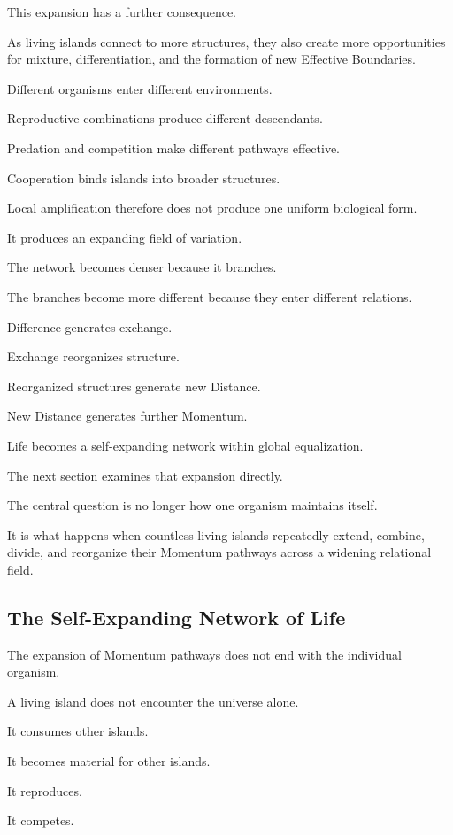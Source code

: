 This expansion has a further consequence.

As living islands connect to more structures, they also create more opportunities for mixture, differentiation, and the formation of new Effective Boundaries.

Different organisms enter different environments.

Reproductive combinations produce different descendants.

Predation and competition make different pathways effective.

Cooperation binds islands into broader structures.

Local amplification therefore does not produce one uniform biological form.

It produces an expanding field of variation.

The network becomes denser because it branches.

The branches become more different because they enter different relations.

Difference generates exchange.

Exchange reorganizes structure.

Reorganized structures generate new Distance.

New Distance generates further Momentum.

Life becomes a self-expanding network within global equalization.

The next section examines that expansion directly.

The central question is no longer how one organism maintains itself.

It is what happens when countless living islands repeatedly extend, combine, divide, and reorganize their Momentum pathways across a widening relational field.

\subsection*{\textbf{The Self-Expanding Network of Life}}

The expansion of Momentum pathways does not end with the individual organism.

A living island does not encounter the universe alone.

It consumes other islands.

It becomes material for other islands.

It reproduces.

It competes.

